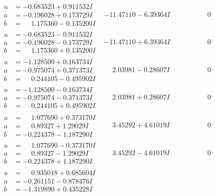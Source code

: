 \documentclass[1p]{elsarticle_modified}
\theoremstyle{definition}
\begin{document}
$$\begin{array}{c|c|c}
 \hline 
\begin{aligned}
u &= -0.683523 + 0.911532 I \\
a &= -0.196028 + 0.173729 I \\
b &= \phantom{-}1.175360 - 0.135200 I\end{aligned}
 & -11.47110 - 6.39364 I & \phantom{-0.000000 } 0 \\ \hline\begin{aligned}
u &= -0.683523 - 0.911532 I \\
a &= -0.196028 - 0.173729 I \\
b &= \phantom{-}1.175360 + 0.135200 I\end{aligned}
 & -11.47110 + 6.39364 I & \phantom{-0.000000 } 0 \\ \hline\begin{aligned}
u &= -1.128500 + 0.163734 I \\
a &= -0.975074 + 0.371373 I \\
b &= \phantom{-}0.244105 - 0.495902 I\end{aligned}
 & \phantom{-}2.03981 - 0.28607 I & \phantom{-0.000000 } 0 \\ \hline\begin{aligned}
u &= -1.128500 - 0.163734 I \\
a &= -0.975074 - 0.371373 I \\
b &= \phantom{-}0.244105 + 0.495902 I\end{aligned}
 & \phantom{-}2.03981 + 0.28607 I & \phantom{-0.000000 } 0 \\ \hline\begin{aligned}
u &= \phantom{-}1.077690 + 0.373170 I \\
a &= \phantom{-}0.89327 + 1.29029 I \\
b &= -0.224378 - 1.187290 I\end{aligned}
 & \phantom{-}3.45292 + 4.61019 I & \phantom{-0.000000 } 0 \\ \hline\begin{aligned}
u &= \phantom{-}1.077690 - 0.373170 I \\
a &= \phantom{-}0.89327 - 1.29029 I \\
b &= -0.224378 + 1.187290 I\end{aligned}
 & \phantom{-}3.45292 - 4.61019 I & \phantom{-0.000000 } 0 \\ \hline\begin{aligned}
u &= \phantom{-}0.935018 + 0.685604 I \\
a &= -0.261151 - 0.878476 I \\
b &= -1.319890 + 0.435228 I\end{aligned}

\end{array}$$
\end{document}
